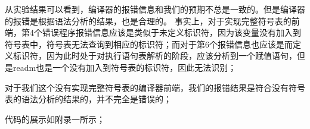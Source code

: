 从实验结果可以看到，编译器的报错信息和我们的预期不总是一致的。但是编译器的报错是根据语法分析的结果，也是合理的。
事实上，对于实现完整符号表的前端，第4个错误程序报错信息应该是类似于未定义标识符，因为该变量没有加入到符号表中，符号表无法查询到相应的标识符；而对于第6个报错信息也应该是而定义标识符，因为此时处于对执行语句表解析的阶段，应该分析到一个赋值语句，但是readm也是一个没有加入到符号表的标识符，因此无法识别；

对于我们这个没有实现完整符号表的编译器前端，我们的报错结果是符合没有符号表的语法分析的结果的，并不完全是错误的；

代码的展示如附录一所示；

